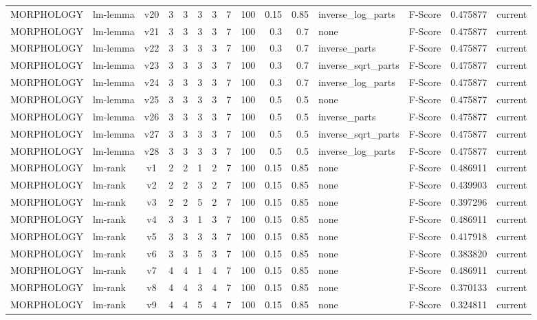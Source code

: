 \documentclass{article}
\begin{document}
\begin{xltabular}{\linewidth}{@{}lYcrrrrrrrrYlrl@{}}
MORPHOLOGY & lm-lemma & v20 & 3 & 3 & 3 & 3 & 7 & 100 & 0.15 & 0.85 & inverse\_log\_parts & F-Score & 0.475877 & current \\
MORPHOLOGY & lm-lemma & v21 & 3 & 3 & 3 & 3 & 7 & 100 & 0.3 & 0.7 & none & F-Score & 0.475877 & current \\
MORPHOLOGY & lm-lemma & v22 & 3 & 3 & 3 & 3 & 7 & 100 & 0.3 & 0.7 & inverse\_parts & F-Score & 0.475877 & current \\
MORPHOLOGY & lm-lemma & v23 & 3 & 3 & 3 & 3 & 7 & 100 & 0.3 & 0.7 & inverse\_sqrt\_parts & F-Score & 0.475877 & current \\
MORPHOLOGY & lm-lemma & v24 & 3 & 3 & 3 & 3 & 7 & 100 & 0.3 & 0.7 & inverse\_log\_parts & F-Score & 0.475877 & current \\
MORPHOLOGY & lm-lemma & v25 & 3 & 3 & 3 & 3 & 7 & 100 & 0.5 & 0.5 & none & F-Score & 0.475877 & current \\
MORPHOLOGY & lm-lemma & v26 & 3 & 3 & 3 & 3 & 7 & 100 & 0.5 & 0.5 & inverse\_parts & F-Score & 0.475877 & current \\
MORPHOLOGY & lm-lemma & v27 & 3 & 3 & 3 & 3 & 7 & 100 & 0.5 & 0.5 & inverse\_sqrt\_parts & F-Score & 0.475877 & current \\
MORPHOLOGY & lm-lemma & v28 & 3 & 3 & 3 & 3 & 7 & 100 & 0.5 & 0.5 & inverse\_log\_parts & F-Score & 0.475877 & current \\
MORPHOLOGY & lm-rank & v1 & 2 & 2 & 1 & 2 & 7 & 100 & 0.15 & 0.85 & none & F-Score & 0.486911 & current \\
MORPHOLOGY & lm-rank & v2 & 2 & 2 & 3 & 2 & 7 & 100 & 0.15 & 0.85 & none & F-Score & 0.439903 & current \\
MORPHOLOGY & lm-rank & v3 & 2 & 2 & 5 & 2 & 7 & 100 & 0.15 & 0.85 & none & F-Score & 0.397296 & current \\
MORPHOLOGY & lm-rank & v4 & 3 & 3 & 1 & 3 & 7 & 100 & 0.15 & 0.85 & none & F-Score & 0.486911 & current \\
MORPHOLOGY & lm-rank & v5 & 3 & 3 & 3 & 3 & 7 & 100 & 0.15 & 0.85 & none & F-Score & 0.417918 & current \\
MORPHOLOGY & lm-rank & v6 & 3 & 3 & 5 & 3 & 7 & 100 & 0.15 & 0.85 & none & F-Score & 0.383820 & current \\
MORPHOLOGY & lm-rank & v7 & 4 & 4 & 1 & 4 & 7 & 100 & 0.15 & 0.85 & none & F-Score & 0.486911 & current \\
MORPHOLOGY & lm-rank & v8 & 4 & 4 & 3 & 4 & 7 & 100 & 0.15 & 0.85 & none & F-Score & 0.370133 & current \\
MORPHOLOGY & lm-rank & v9 & 4 & 4 & 5 & 4 & 7 & 100 & 0.15 & 0.85 & none & F-Score & 0.324811 & current \\

\end{xltabular}
\end{document}
